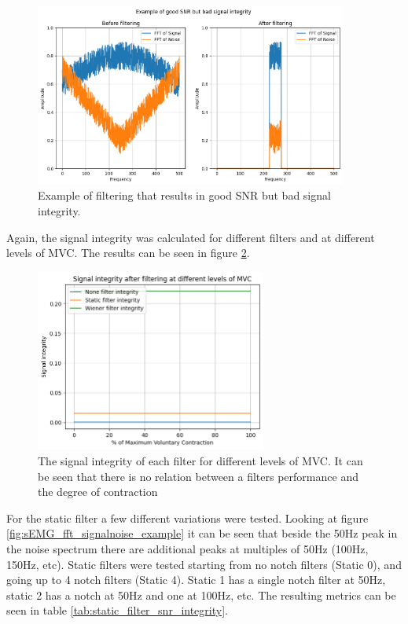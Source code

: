 \begin{figure}[h!t]
	\begin{center}
		\includegraphics[height=60mm]{images/good_snr_bad_integrity.png}
	\end{center}
	\caption{Example of filtering that results in good SNR but bad signal integrity.}
	\label{fig:good_snr_bad_integrity}
\end{figure}

Again, the signal integrity was calculated for different filters and at different levels of MVC. The results can be seen in figure \ref{fig:filter_signal_integrity_mvc}.

\begin{figure}[h!t]
	\begin{center}
		\includegraphics[height=60mm]{images/filter_signal_integrity_mvc.png}
	\end{center}
	\caption{The signal integrity of each filter for different levels of MVC. It can be seen that there is no relation between a filters performance and the degree of contraction}
	\label{fig:filter_signal_integrity_mvc}
\end{figure}

For the static filter a few different variations were tested. Looking at figure \ref{fig:sEMG_fft_signalnoise_example} it can be seen that beside the 50Hz peak in the noise spectrum there are additional peaks at multiples of 50Hz (100Hz, 150Hz, etc). Static filters were tested starting from no notch filters (Static 0), and going up to 4 notch filters (Static 4). Static 1 has a single notch filter at 50Hz, static 2 has a notch at 50Hz and one at 100Hz, etc. The resulting metrics can be seen in table \ref{tab:static_filter_snr_integrity}.


